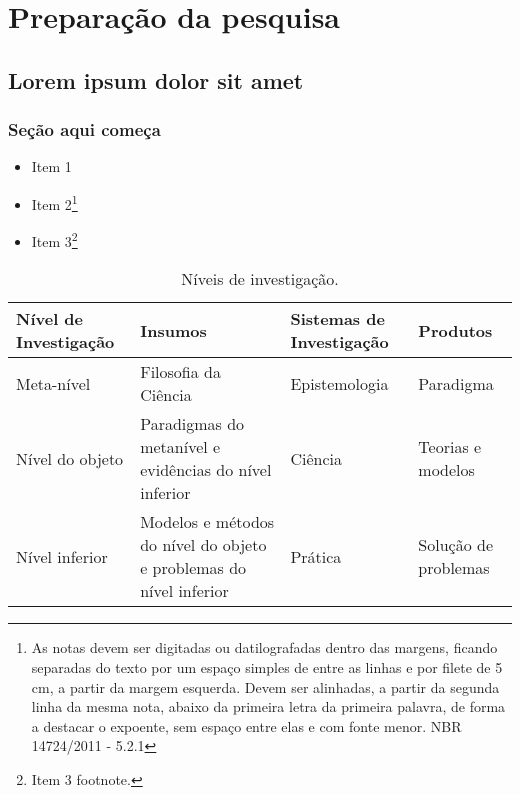 \documentclass[12pt,openright,twoside,a4paper]{abntex2}
\begin{document}
\lipsum[1-2]

\part{Preparação da pesquisa}

\chapter{Lorem ipsum dolor sit amet}

\section{Seção aqui começa}

\lipsum[3]

\begin{itemize}
  \item Item 1
  \item Item 2\footnote{As notas devem ser digitadas ou datilografadas dentro
  das margens, ficando separadas do texto por um espaço simples de entre as
  linhas e por filete de 5 cm, a partir da margem esquerda. Devem ser
  alinhadas, a partir da segunda linha da mesma nota, abaixo da primeira letra
  da primeira palavra, de forma a destacar o expoente, sem espaço entre elas e
  com fonte menor. NBR 14724/2011 - 5.2.1}
  \item Item 3\footnote{Item 3 footnote.}
\end{itemize}


\lipsum[4]

\begin{table}[htb]
\footnotesize
\caption[Níveis de investigação]{\footnotesize{Níveis de investigação.
\cite{van86}}}
\label{tab-nivinv}
\begin{tabular}{p{2.6cm}|p{6.0cm}|p{2.25cm}|p{3.40cm}}
   \textbf{Nível de Investigação} & \textbf{Insumos}  & \textbf{Sistemas de Investigação}  & \textbf{Produtos}  \\
    \hline
    Meta-nível & Filosofia\index{Filosofia} da Ciência  & Epistemologia &
    Paradigma  \\
    \hline
    Nível do objeto & Paradigmas do metanível e evidências do nível inferior &
    Ciência  & Teorias e modelos \\
    \hline
    Nível inferior & Modelos e métodos do nível do objeto e problemas do nível inferior & Prática & Solução de problemas  \\
\end{tabular}
\end{table}
\end{document}
